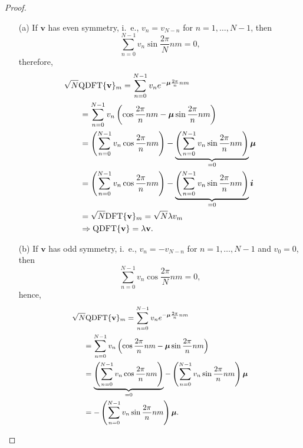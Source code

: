 \begin{proof}
\begin{itemize}
\item[(a)] If $ \mathbf{v} $ has even symmetry, i.~e., $ v_n = v_{N-n} $ for $ n=1,\dots,N-1 $, then
\begin{equation}
\sum_{n=0}^{N-1} v_n \sin \frac{2\pi}{N} nm = 0,
\end{equation}
therefore,
\newcommand{\correctinghspace}{-1.8cm}
\begin{align*}
\sqrt{N} \text{QDFT}\{ \mathbf{v} \}_m &= \sum_{n=0}^{N-1} v_n e^{-\qmu \frac{2\pi}{n} nm} \\
&\hspace{\correctinghspace}
=\sum_{n=0}^{N-1} v_n \left( \cos \frac{2\pi}{n} nm - \qmu \sin \frac{2\pi}{n} nm \right) \\
&\hspace{\correctinghspace}
= \left( \sum_{n=0}^{N-1} v_n \cos \frac{2\pi}{n} nm \right) - \underbrace{\left(  \sum_{n=0}^{N-1} v_n \sin \frac{2\pi}{n} nm \right)}_{=0} \qmu \\
&\hspace{\correctinghspace}
= \left( \sum_{n=0}^{N-1} v_n \cos \frac{2\pi}{n} nm \right) - \underbrace{\left(  \sum_{n=0}^{N-1} v_n \sin \frac{2\pi}{n} nm \right)}_{=0} \qi \\
&\hspace{\correctinghspace}
= \sqrt{N} \text{DFT}\{ \mathbf{v} \}_m = \sqrt{N} \lambda v_m \\
&\hspace{\correctinghspace}
\Rightarrow \text{QDFT}\{ \mathbf{v} \} = \lambda \mathbf{v}.
\end{align*}
\item[(b)] If $ \mathbf{v} $ has odd symmetry, i.~e., $ v_n = -v_{N-n} $ for $ n=1,\dots,N-1 $ and $ v_0 = 0 $, then
\begin{equation}
\sum_{n=0}^{N-1} v_n \cos \frac{2\pi}{N} nm = 0,
\end{equation}
hence,
\begin{equation}
\small
\label{eq:17}
\begin{aligned}
\sqrt{N} \text{QDFT}\{ \mathbf{v} \}_m &= \sum_{n=0}^{N-1} v_n e^{-\qmu \frac{2\pi}{n} nm}\\
&\hspace{\correctinghspace}
=
\sum_{n=0}^{N-1} v_n \left( \cos \frac{2\pi}{n} nm - \qmu \sin \frac{2\pi}{n} nm \right) \\
&\hspace{\correctinghspace}
= {\underbrace{\left( \sum_{n=0}^{N-1} v_n \cos \frac{2\pi}{n} nm \right)}_{=0} - \left(  \sum_{n=0}^{N-1} v_n \sin \frac{2\pi}{n} nm \right) \qmu }\\
&\hspace{\correctinghspace}
= - \left(  \sum_{n=0}^{N-1} v_n \sin \frac{2\pi}{n} nm \right) \qmu.
\end{aligned}
\end{equation}


\end{itemize}
\end{proof}
